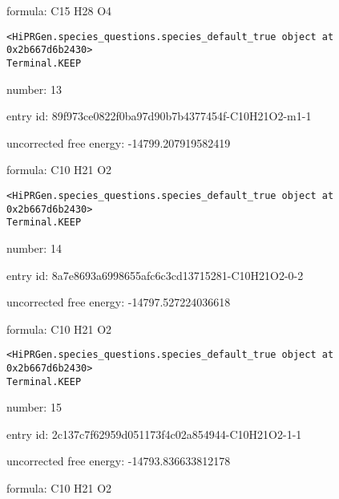 \documentclass{article}
\begin{document}
formula: C15 H28 O4


\vspace{1cm}
\begin{verbatim}
<HiPRGen.species_questions.species_default_true object at 0x2b667d6b2430>
Terminal.KEEP
\end{verbatim}


number: 13



entry id: 89f973ce0822f0ba97d90b7b4377454f-C10H21O2-m1-1



uncorrected free energy: -14799.207919582419



formula: C10 H21 O2


\vspace{1cm}
\begin{verbatim}
<HiPRGen.species_questions.species_default_true object at 0x2b667d6b2430>
Terminal.KEEP
\end{verbatim}


number: 14



entry id: 8a7e8693a6998655afc6c3cd13715281-C10H21O2-0-2



uncorrected free energy: -14797.527224036618



formula: C10 H21 O2


\vspace{1cm}
\begin{verbatim}
<HiPRGen.species_questions.species_default_true object at 0x2b667d6b2430>
Terminal.KEEP
\end{verbatim}


number: 15



entry id: 2c137c7f62959d051173f4c02a854944-C10H21O2-1-1



uncorrected free energy: -14793.836633812178



formula: C10 H21 O2

\end{document}
